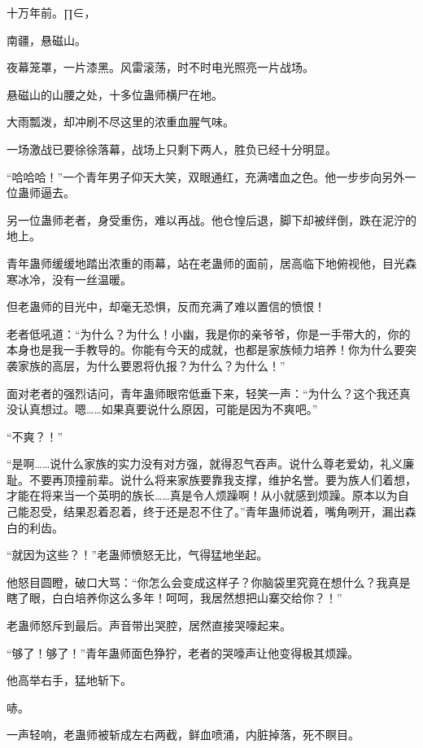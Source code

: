 
\begin{this_body}

十万年前。∏∈，

南疆，悬磁山。

夜幕笼罩，一片漆黑。风雷滚荡，时不时电光照亮一片战场。

悬磁山的山腰之处，十多位蛊师横尸在地。

大雨瓢泼，却冲刷不尽这里的浓重血腥气味。

一场激战已要徐徐落幕，战场上只剩下两人，胜负已经十分明显。

“哈哈哈！”一个青年男子仰天大笑，双眼通红，充满嗜血之色。他一步步向另外一位蛊师逼去。

另一位蛊师老者，身受重伤，难以再战。他仓惶后退，脚下却被绊倒，跌在泥泞的地上。

青年蛊师缓缓地踏出浓重的雨幕，站在老蛊师的面前，居高临下地俯视他，目光森寒冰冷，没有一丝温暖。

但老蛊师的目光中，却毫无恐惧，反而充满了难以置信的愤恨！

老者低吼道：“为什么？为什么！小幽，我是你的亲爷爷，你是一手带大的，你的本身也是我一手教导的。你能有今天的成就，也都是家族倾力培养！你为什么要突袭家族的高层，为什么要恩将仇报？为什么？为什么！”

面对老者的强烈诘问，青年蛊师眼帘低垂下来，轻笑一声：“为什么？这个我还真没认真想过。嗯……如果真要说什么原因，可能是因为不爽吧。”

“不爽？！”

“是啊……说什么家族的实力没有对方强，就得忍气吞声。说什么尊老爱幼，礼义廉耻。不要再顶撞前辈。说什么将来家族要靠我支撑，维护名誉。要为族人们着想，才能在将来当一个英明的族长……真是令人烦躁啊！从小就感到烦躁。原本以为自己能忍受，结果忍着忍着，终于还是忍不住了。”青年蛊师说着，嘴角咧开，漏出森白的利齿。

“就因为这些？！”老蛊师愤怒无比，气得猛地坐起。

他怒目圆瞪，破口大骂：“你怎么会变成这样子？你脑袋里究竟在想什么？我真是瞎了眼，白白培养你这么多年！呵呵，我居然想把山寨交给你？！”

老蛊师怒斥到最后。声音带出哭腔，居然直接哭嚎起来。

“够了！够了！”青年蛊师面色狰狞，老者的哭嚎声让他变得极其烦躁。

他高举右手，猛地斩下。

哧。

一声轻响，老蛊师被斩成左右两截，鲜血喷涌，内脏掉落，死不瞑目。


\end{this_body}
